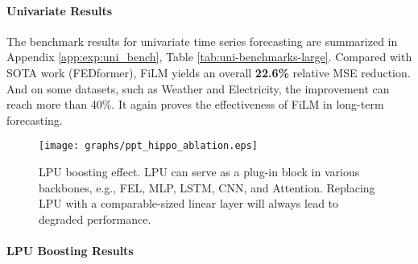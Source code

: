 \documentclass{article}
\begin{document}
\paragraph{Univariate Results}
The benchmark results for univariate time series
forecasting are summarized in Appendix \ref{app:exp:uni_bench}, Table \ref{tab:uni-benchmarks-large}. Compared with
SOTA work (FEDformer), FiLM yields an overall \textbf{22.6\%} relative
MSE reduction. And on some datasets, such as Weather and
Electricity, the improvement can reach more than 40\%. It again
proves the effectiveness of FiLM in long-term forecasting.


\begin{figure*}[t]
\centering
\texttt{[image: graphs/ppt\_hippo\_ablation.eps]}
\caption{LPU boosting effect. LPU can serve as a plug-in block in various backbones, e.g., FEL, MLP, LSTM, CNN, and Attention. Replacing LPU with a comparable-sized linear layer will always lead to degraded performance.}
\label{fig:boost}
\vskip -0.2in
\end{figure*}


\paragraph{LPU Boosting Results}
\vskip -0.1in
\end{document}

